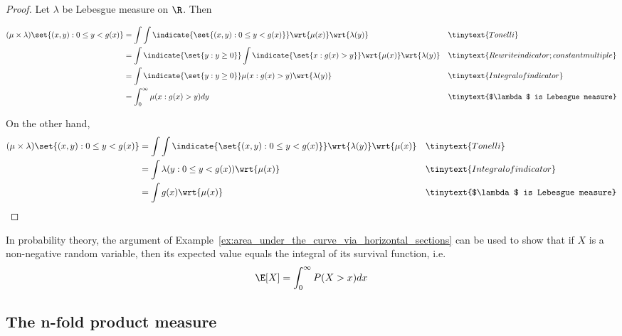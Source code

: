 \documentclass{article} %
\begin{document}
\begin{proof}
Let $\lambda$ be Lebesgue measure on $\R$.  Then 

\begin{align*}
(\mu \times \lambda)\set{(x,y): 0 \leq y < g(x)} &= \int \int \indicate{\set{(x,y): 0 \leq y < g(x)}} \wrt{\mu(x)} \wrt{\lambda(y)} && \tinytext{Tonelli} \\
&= \int \indicate{\set{y: y \geq 0}} \int \indicate{\set{x: g(x) >y}}  \wrt{\mu(x)} \wrt{\lambda(y)} && \tinytext{Rewrite indicator; constant multiple} \\
 &= \int \indicate{\set{y: y \geq 0}}  \mu(x: g(x) > y) \wrt{\lambda(y)} && \tinytext{Integral of indicator} \\
 &= \int_0^\infty \mu(x: g(x) > y) dy && \tinytext{$\lambda$ is Lebesgue measure} \\
\end{align*}

On the other hand,
\begin{align*}
(\mu \times \lambda)\set{(x,y): 0 \leq y < g(x)} &= \int \int \indicate{\set{(x,y): 0 \leq y < g(x)}}  \wrt{\lambda(y)} \wrt{\mu(x)} && \tinytext{Tonelli} \\
 &= \int   \lambda(y: 0 \leq y < g(x)) \wrt{\mu(x)} && \tinytext{Integral of indicator} \\
&= \int   g(x) \wrt{\mu(x)} && \tinytext{$\lambda$ is Lebesgue measure} \\
\end{align*}	

\end{proof}


\begin{remark}
In probability theory, the argument of Example~\ref{ex:area_under_the_curve_via_horizontal_sections} can be used to show that if $X$ is a non-negative random variable, then its expected value equals the integral of its survival function, i.e. 
\[ \E[X] = \int_0^\infty P(X > x) dx \]
\label{rk:expected_value_equals_integral_of_its_survival_function}
\end{remark}


\subsection{The n-fold product measure}
\end{document}
